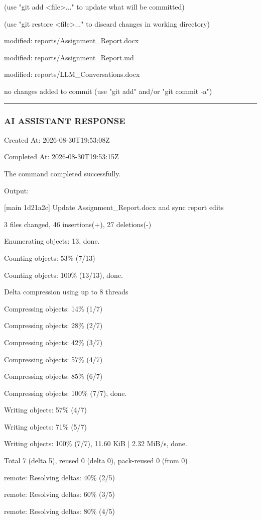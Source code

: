 \documentclass[11pt,a4paper]{article}
\begin{document}
{(use "git add <file>..." to update what will be committed)

(use "git restore <file>..." to discard changes in working directory)

modified:   reports/Assignment\_Report.docx

modified:   reports/Assignment\_Report.md

modified:   reports/LLM\_Conversations.docx


no changes added to commit (use "git add" and/or "git commit -a")


\hrule

\subsubsection{AI ASSISTANT RESPONSE}

Created At: 2026-08-30T19:53:08Z

Completed At: 2026-08-30T19:53:15Z


The command completed successfully.

Output:

[main 1d21a2c] Update Assignment\_Report.docx and sync report edits

3 files changed, 46 insertions(+), 27 deletions(-)

Enumerating objects: 13, done.

Counting objects:  53\% (7/13)

Counting objects: 100\% (13/13), done.

Delta compression using up to 8 threads

Compressing objects:  14\% (1/7)

Compressing objects:  28\% (2/7)

Compressing objects:  42\% (3/7)

Compressing objects:  57\% (4/7)

Compressing objects:  85\% (6/7)

Compressing objects: 100\% (7/7), done.

Writing objects:  57\% (4/7)

Writing objects:  71\% (5/7)

Writing objects: 100\% (7/7), 11.60 KiB | 2.32 MiB/s, done.

Total 7 (delta 5), reused 0 (delta 0), pack-reused 0 (from 0)

remote: Resolving deltas:  40\% (2/5)

remote: Resolving deltas:  60\% (3/5)

remote: Resolving deltas:  80\% (4/5)

}
\end{document}
